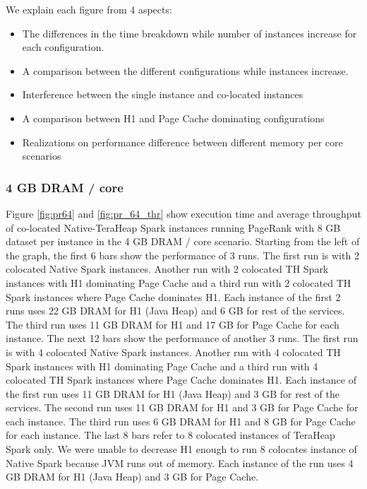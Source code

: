We explain each figure from 4 aspects:
\begin{itemize}
\item{The differences in the time breakdown while number of instances increase for each configuration.}
\item{A comparison between the different configurations while instances increase.}
\item{Interference between the single instance and co-located instances}
\item{A comparison between H1 and Page Cache dominating configurations}
\item{Realizations on performance difference between different memory per core scenarios}
\end{itemize}

\subsubsection{4 GB DRAM / core}

Figure \ref{fig:pr64} and \ref{fig:pr_64_thr} show execution time and average throughput of co-located
Native-TeraHeap Spark instances running PageRank with 8 GB
dataset per instance in the 4 GB DRAM / core scenario.
Starting from the left of the graph, the first 6 bars show the
performance of 3 runs. The first run is with 2 colocated Native Spark instances.
Another run with 2 colocated TH Spark instances with H1 dominating Page Cache
and a third run with 2 colocated TH Spark instances where Page Cache dominates H1.
Each instance of the first 2 runs uses 22 GB DRAM for H1 (Java Heap) and 6 GB for rest of the services.
The third run uses 11 GB DRAM for H1 and 17 GB for Page Cache for each instance. 
The next 12 bars show the performance of another 3 runs. The first run is with 4 colocated Native Spark instances.
Another run with 4 colocated TH Spark instances with H1 dominating Page Cache
and a third run with 4 colocated TH Spark instances where Page Cache dominates H1.
Each instance of the first run uses 11 GB DRAM for H1 (Java Heap) and 3 GB for rest of the services.
The second run uses 11 GB DRAM for H1 and 3 GB for Page Cache for each instance.
The third run uses 6 GB DRAM for H1 and 8 GB for Page Cache for each instance.
The last 8 bars refer to 8 colocated instances of TeraHeap Spark only. 
We were unable to decrease H1 enough to run 8 colocates instance of Native Spark
because JVM runs out of memory. Each instance of the run uses 4 GB DRAM for H1 (Java Heap) and 3 GB for Page Cache.


